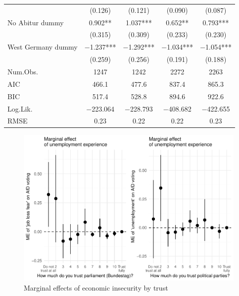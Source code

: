 \documentclass[
]{article}
\begin{document}
\begin{table}[!h]
\begin{tabular}[t]{lcccc}
 & (\num{0.126}) & (\num{0.121}) & (\num{0.090}) & (\num{0.087})\\
No Abitur dummy & \num{0.902}** & \num{1.037}*** & \num{0.652}** & \num{0.793}***\\
 & (\num{0.315}) & (\num{0.309}) & (\num{0.233}) & (\num{0.230})\\
West Germany dummy & \num{-1.237}*** & \num{-1.292}*** & \num{-1.034}*** & \num{-1.054}***\\
 & (\num{0.259}) & (\num{0.256}) & (\num{0.191}) & (\num{0.188})\\
\midrule
Num.Obs. & \num{1247} & \num{1242} & \num{2272} & \num{2263}\\
AIC & \num{466.1} & \num{477.6} & \num{837.4} & \num{865.3}\\
BIC & \num{517.4} & \num{528.8} & \num{894.6} & \num{922.6}\\
Log.Lik. & \num{-223.064} & \num{-228.793} & \num{-408.682} & \num{-422.655}\\
RMSE & \num{0.23} & \num{0.22} & \num{0.22} & \num{0.23}\\
\bottomrule
\end{tabular}
\end{table}

\begin{figure}
\centering
\includegraphics{AVCD_Final-Assignment-Edenhofer_files/figure-latex/regression-results-1-plot2-1.pdf}
\caption{Marginal effects of economic insecurity by trust}
\end{figure}
\end{document}
